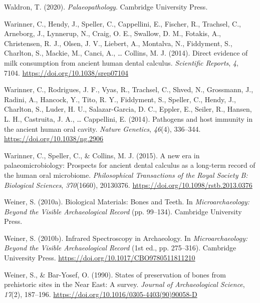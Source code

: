 \documentclass[
  letterpaper,
]{book}
\newlength{\cslhangindent}
\newlength{\cslentryspacingunit} %
\newenvironment{CSLReferences}[2] %
 {%
  \setlength{\parindent}{0pt}
  \ifodd #1
  \let\oldpar\par
  \def\par{\hangindent=\cslhangindent\oldpar}
  \fi
  \setlength{\parskip}{#2\cslentryspacingunit}
 }%
 {}
\begin{document}
\begin{CSLReferences}{1}{0}
\leavevmode{}%
Waldron, T. (2020). \emph{Palaeopathology}. {Cambridge University
Press}.

\leavevmode{}%
Warinner, C., Hendy, J., Speller, C., Cappellini, E., Fischer, R.,
Trachsel, C., Arneborg, J., Lynnerup, N., Craig, O. E., Swallow, D. M.,
Fotakis, A., Christensen, R. J., Olsen, J. V., Liebert, A., Montalva,
N., Fiddyment, S., Charlton, S., Mackie, M., Canci, A., \ldots{}
Collins, M. J. (2014). Direct evidence of milk consumption from ancient
human dental calculus. \emph{Scientific Reports}, \emph{4}, 7104.
\url{https://doi.org/10.1038/srep07104}

\leavevmode{}%
Warinner, C., Rodrigues, J. F., Vyas, R., Trachsel, C., Shved, N.,
Grossmann, J., Radini, A., Hancock, Y., Tito, R. Y., Fiddyment, S.,
Speller, C., Hendy, J., Charlton, S., Luder, H. U., Salazar-Garcia, D.
C., Eppler, E., Seiler, R., Hansen, L. H., Castruita, J. A., \ldots{}
Cappellini, E. (2014). Pathogens and host immunity in the ancient human
oral cavity. \emph{Nature Genetics}, \emph{46}(4), 336--344.
\url{https://doi.org/10.1038/ng.2906}

\leavevmode{}%
Warinner, C., Speller, C., \& Collins, M. J. (2015). A new era in
palaeomicrobiology: Prospects for ancient dental calculus as a long-term
record of the human oral microbiome. \emph{Philosophical Transactions of
the Royal Society B: Biological Sciences}, \emph{370}(1660), 20130376.
\url{https://doi.org/10.1098/rstb.2013.0376}

\leavevmode{}%
Weiner, S. (2010a). Biological {Materials}: {Bones} and {Teeth}. In
\emph{Microarchaeology: {Beyond} the {Visible Archaeological Record}}
(pp. 99--134). {Cambridge University Press}.

\leavevmode{}%
Weiner, S. (2010b). Infrared {Spectroscopy} in {Archaeology}. In
\emph{Microarchaeology: {Beyond} the {Visible Archaeological Record}}
(1st ed., pp. 275--316). {Cambridge University Press}.
\url{https://doi.org/10.1017/CBO9780511811210}

\leavevmode{}%
Weiner, S., \& Bar-Yosef, O. (1990). States of preservation of bones
from prehistoric sites in the {Near East}: {A} survey. \emph{Journal of
Archaeological Science}, \emph{17}(2), 187--196.
\url{https://doi.org/10.1016/0305-4403(90)90058-D}


\end{CSLReferences}
\end{document}
